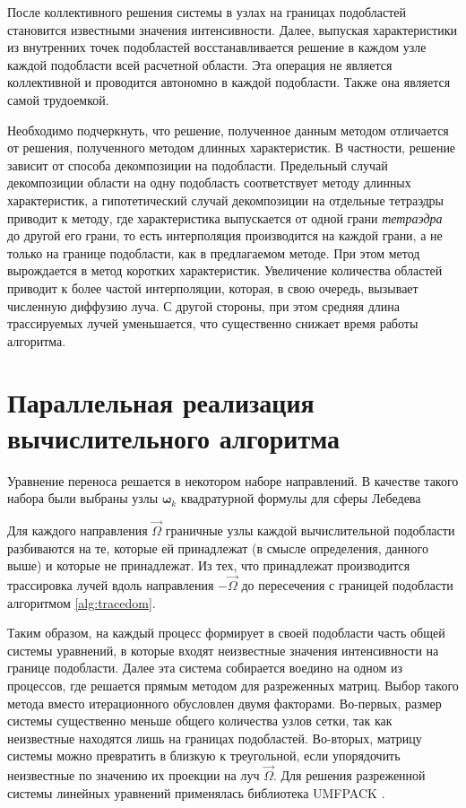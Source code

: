 После коллективного решения системы в узлах на границах подобластей становится известными значения интенсивности. Далее, выпуская характеристики из внутренних точек подобластей восстанавливается решение в каждом узле каждой подобласти всей расчетной области. Эта операция не является коллективной и проводится автономно в каждой подобласти. Также она является самой трудоемкой.

Необходимо подчеркнуть, что решение, полученное данным методом отличается от решения, полученного методом длинных характеристик. В частности, решение зависит от способа декомпозиции на подобласти. Предельный случай декомпозиции области на одну подобласть соответствует методу длинных характеристик, а гипотетический случай декомпозиции на отдельные тетраэдры приводит к методу, где характеристика выпускается от одной грани \emph{тетраэдра} до другой его грани, то есть интерполяция производится на каждой грани, а не только на границе подобласти, как в предлагаемом методе. При этом метод вырождается в метод коротких характеристик. Увеличение количества областей приводит к более частой интерполяции, которая, в свою очередь, вызывает численную диффузию луча. С другой стороны, при этом средняя длина трассируемых лучей уменьшается, что существенно снижает время работы алгоритма.

\section{Параллельная реализация вычислительного алгоритма}

Уравнение переноса решается в некотором наборе направлений. В качестве такого набора были выбраны узлы $\boldsymbol{\omega}_k$ квадратурной формулы для сферы Лебедева 

Для каждого направления $\vec \Omega$ граничные узлы каждой вычислительной подобласти разбиваются на те, которые ей принадлежат (в смысле определения, данного выше) и которые не принадлежат. Из тех, что принадлежат производится трассировка лучей вдоль направления $-\vec \Omega$ до пересечения с границей подобласти алгоритмом \ref{alg:tracedom}.

Таким образом, на каждый процесс формирует в своей подобласти часть общей системы уравнений, в которые входят неизвестные значения интенсивности на границе подобласти.
Далее эта система собирается воедино на одном из процессов, где решается прямым методом для разреженных матриц. Выбор такого метода вместо итерационного обусловлен двумя факторами. Во-первых, размер системы существенно меньше общего количества узлов сетки, так как неизвестные находятся лишь на границах подобластей. Во-вторых, матрицу системы можно превратить в близкую к треугольной, если упорядочить неизвестные по значению их проекции на луч $\vec \Omega$. Для решения разреженной системы линейных уравнений применялась библиотека UMFPACK \cite{umfpack2004}.

